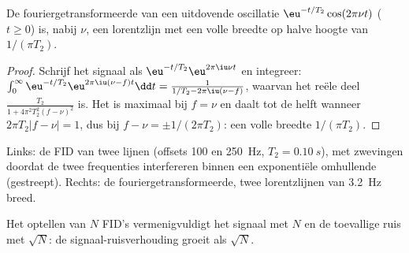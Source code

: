\begin{theorem}\label{thm:b3:advanced-nmr:lorentzian}
De fouriergetransformeerde van een uitdovende oscillatie $\eu^{-t/T_2}\cos(2\pi\nu t)$ ($t \ge 0$) is,
nabij $\nu$, een lorentzlijn met een volle breedte op halve hoogte van $1/(\pi T_2)$.
\end{theorem}

\begin{proof}
Schrijf het signaal als $\eu^{-t/T_2}\eu^{2\pi\iu\nu t}$ en integreer:
$\int_0^\infty\eu^{-t/T_2}\eu^{2\pi\iu(\nu - f)t}\dd t = \frac{1}{1/T_2 - 2\pi\iu(\nu - f)}$, waarvan het
reële deel $\frac{T_2}{1 + 4\pi^2T_2^2(f - \nu)^2}$ is. Het is maximaal bij
$f = \nu$ en daalt tot de
helft wanneer $2\pi T_2|f - \nu| = 1$, dus bij $f - \nu = \pm1/(2\pi T_2)$: een
volle breedte
$1/(\pi T_2)$.
\end{proof}

\begin{omfigure}

{\small Links: de FID van twee lijnen (offsets 100 en \qty{250}{Hz}, $T_2 = \qty{0.10}{s}$),
met zwevingen doordat de twee frequenties interfereren binnen een
exponentiële omhullende (gestreept). Rechts: de fouriergetransformeerde,
twee lorentzlijnen van \qty{3.2}{Hz} breed.}
\end{omfigure}

\begin{proposition}[Signaalmiddeling]\label{prop:b3:advanced-nmr:averaging}
Het optellen van $N$ FID's vermenigvuldigt het signaal met $N$ en de
toevallige ruis met $\sqrt N$:
de signaal-ruisverhouding groeit als $\sqrt N$.
\end{proposition}

